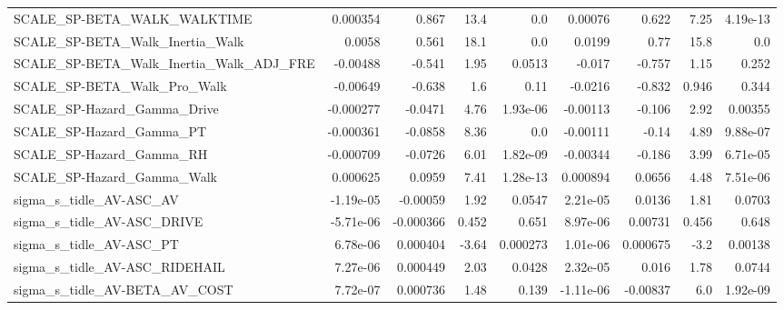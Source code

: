 \begin{tabular}{lrrrrrrrr}
SCALE\_SP-BETA\_WALK\_WALKTIME                        &    0.000354 &        0.867 &     13.4 &      0.0 &    0.00076 &       0.622 &         7.25 &      4.19e-13 \\
SCALE\_SP-BETA\_Walk\_Inertia\_Walk                    &      0.0058 &        0.561 &     18.1 &      0.0 &     0.0199 &        0.77 &         15.8 &           0.0 \\
SCALE\_SP-BETA\_Walk\_Inertia\_Walk\_ADJ\_FRE            &    -0.00488 &       -0.541 &     1.95 &   0.0513 &     -0.017 &      -0.757 &         1.15 &         0.252 \\
SCALE\_SP-BETA\_Walk\_Pro\_Walk                        &    -0.00649 &       -0.638 &      1.6 &     0.11 &    -0.0216 &      -0.832 &        0.946 &         0.344 \\
SCALE\_SP-Hazard\_Gamma\_Drive                        &   -0.000277 &      -0.0471 &     4.76 & 1.93e-06 &   -0.00113 &      -0.106 &         2.92 &       0.00355 \\
SCALE\_SP-Hazard\_Gamma\_PT                           &   -0.000361 &      -0.0858 &     8.36 &      0.0 &   -0.00111 &       -0.14 &         4.89 &      9.88e-07 \\
SCALE\_SP-Hazard\_Gamma\_RH                           &   -0.000709 &      -0.0726 &     6.01 & 1.82e-09 &   -0.00344 &      -0.186 &         3.99 &      6.71e-05 \\
SCALE\_SP-Hazard\_Gamma\_Walk                         &    0.000625 &       0.0959 &     7.41 & 1.28e-13 &   0.000894 &      0.0656 &         4.48 &      7.51e-06 \\
sigma\_s\_tidle\_AV-ASC\_AV                            &   -1.19e-05 &     -0.00059 &     1.92 &   0.0547 &   2.21e-05 &      0.0136 &         1.81 &        0.0703 \\
sigma\_s\_tidle\_AV-ASC\_DRIVE                         &   -5.71e-06 &    -0.000366 &    0.452 &    0.651 &   8.97e-06 &     0.00731 &        0.456 &         0.648 \\
sigma\_s\_tidle\_AV-ASC\_PT                            &    6.78e-06 &     0.000404 &    -3.64 & 0.000273 &   1.01e-06 &    0.000675 &         -3.2 &       0.00138 \\
sigma\_s\_tidle\_AV-ASC\_RIDEHAIL                      &    7.27e-06 &     0.000449 &     2.03 &   0.0428 &   2.32e-05 &       0.016 &         1.78 &        0.0744 \\
sigma\_s\_tidle\_AV-BETA\_AV\_COST                      &    7.72e-07 &     0.000736 &     1.48 &    0.139 &  -1.11e-06 &    -0.00837 &          6.0 &      1.92e-09 \\

\end{tabular}
